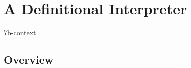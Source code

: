 \chapter{A Definitional Interpreter}

\begin{center}
    {7b-context}
\end{center}

\section{Overview}
